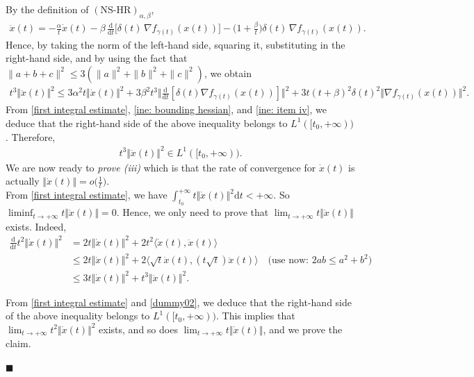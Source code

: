 \documentclass[11pt]{article}
\numberwithin{equation}{section}
\newenvironment{proof}{\bigskip\noindent{\bf Proof.}}{\hfill $\blacksquare$ \par\bigskip\noindent}
\begin{document}
\begin{proof}
By the definition of $(\text{NS-HR})_{\alpha,\beta}$, 
\begin{align*}
    \ddot{x}(t)=-\frac{\alpha}{t}\dot x(t)-\beta\,\frac{\mathrm{d}}{\mathrm{d}t}\!\Big[\delta(t)\,\nabla f_{\gamma(t)}(x(t))\Big]
-\Big(1+\frac{\beta}{t}\Big)\delta(t)\,\nabla f_{\gamma(t)}(x(t)).
\end{align*}
Hence, by taking the norm of the left-hand side, squaring it, substituting in the right-hand side, and by using the fact that $\|a+b+c\|^2 \leq 3 (\|a\|^2 + \|b\|^2 + \|c\|^2)$, we obtain
\begin{align}
\label{ine: summability of acceleration}
    t^3\Vert\ddot{x}(t)\Vert^2 \le 3\alpha^2t \Vert \dot{x}(t) \Vert^2+3\beta^2t^3\Big\Vert \frac{\mathrm{d}}{\mathrm{d}t}[\delta(t)\nabla f_{\gamma(t)}(x(t))] \Big \Vert^2+3t(t+\beta)^2\delta(t)^2\Vert \nabla f_{\gamma(t)}(x(t)) \Vert^2.
\end{align}
From \eqref{first integral estimate}, \eqref{ine: bounding hessian}, and \eqref{ine: item iv}, we deduce that the right-hand side of the above inequality belongs to $L^1([t_0,+\infty))$. Therefore,
\begin{align}\label{dummy02}
 t^3\Vert\ddot{x}(t)\Vert^2 \in L^1([t_0,+\infty)).   
\end{align}
We are now ready to \emph{prove \textit{(iii)}} which is that the rate of convergence for $\dot{x}(t)$ is actually $\Vert\dot{x}(t)\Vert=o\big(\frac{1}{t}\big)$. \\
From \eqref{first integral estimate}, we have $\int_{t_0}^{+\infty} t\Vert \dot{x}(t) \Vert^2 \mathrm{d}t < +\infty$. So $\liminf_{t\rightarrow+\infty}t\Vert \dot{x}(t) \Vert =0$. Hence, we only need to prove that $\lim_{t \rightarrow+\infty}t\Vert \dot{x}(t) \Vert$ exists. Indeed, 
\begin{align*}
\frac{\mathrm{d}}{\mathrm{d}t} t^2\Vert\dot{x}(t)\Vert^2 &=2t\Vert \dot{x}(t) \Vert^2+2t^2\langle \dot{x}(t),\ddot{x}(t)\rangle \\
&\le 2t\Vert \dot{x}(t) \Vert^2+2\langle \sqrt{t}\dot{x}(t),(t\sqrt{t})\ddot{x}(t)\rangle \quad \textrm{(use now: $2ab \leq a^2 + b^2$)}\\
&\le3t\Vert \dot{x}(t) \Vert^2 + t^3\Vert \ddot{x}(t) \Vert^2.
\end{align*}

From \eqref{first integral estimate} and \eqref{dummy02}, we deduce that the right-hand side of the above inequality belongs to $L^1([t_0,+\infty))$. This implies that $\lim_{t \rightarrow+\infty}t^2\Vert \dot{x}(t) \Vert^2$ exists, and so does $\lim_{t \rightarrow+\infty}t\Vert \dot{x}(t) \Vert$, and we prove the claim. 


\end{proof}
\end{document}

